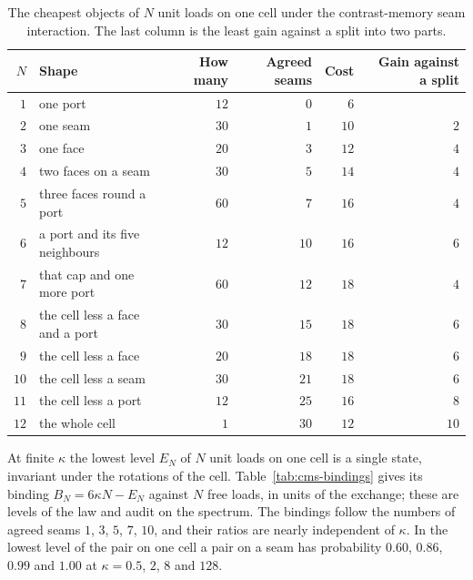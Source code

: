 \begin{table}[htbp]
\centering\small
\caption{The cheapest objects of $N$ unit loads on one cell under the contrast-memory seam interaction.
The last column is the least gain against a split into two parts.}
\label{tab:cms-objects}
\begin{tabular}{@{}rlrrrr@{}}
\toprule
$N$ & Shape & How many & Agreed seams & Cost & Gain against a split\\
\midrule
$1$ & one port & $12$ & $0$ & $6$ & \\
$2$ & one seam & $30$ & $1$ & $10$ & $2$\\
$3$ & one face & $20$ & $3$ & $12$ & $4$\\
$4$ & two faces on a seam & $30$ & $5$ & $14$ & $4$\\
$5$ & three faces round a port & $60$ & $7$ & $16$ & $4$\\
$6$ & a port and its five neighbours & $12$ & $10$ & $16$ & $6$\\
$7$ & that cap and one more port & $60$ & $12$ & $18$ & $4$\\
$8$ & the cell less a face and a port & $30$ & $15$ & $18$ & $6$\\
$9$ & the cell less a face & $20$ & $18$ & $18$ & $6$\\
$10$ & the cell less a seam & $30$ & $21$ & $18$ & $6$\\
$11$ & the cell less a port & $12$ & $25$ & $16$ & $8$\\
$12$ & the whole cell & $1$ & $30$ & $12$ & $10$\\
\bottomrule
\end{tabular}
\end{table}

At finite $\kappa$ the lowest level $E_N$ of $N$ unit loads on one cell is a single state,
invariant under the rotations of the cell. Table~\ref{tab:cms-bindings} gives its binding
$B_N=6\kappa N-E_N$ against $N$ free loads, in units of the exchange; these are levels of
the law and audit on the spectrum. The bindings follow the numbers of agreed seams $1$,
$3$, $5$, $7$, $10$, and their ratios are nearly independent of $\kappa$. In the lowest
level of the pair on one cell a pair on a seam has probability $0.60$, $0.86$, $0.99$ and
$1.00$ at $\kappa=0.5$, $2$, $8$ and $128$.

